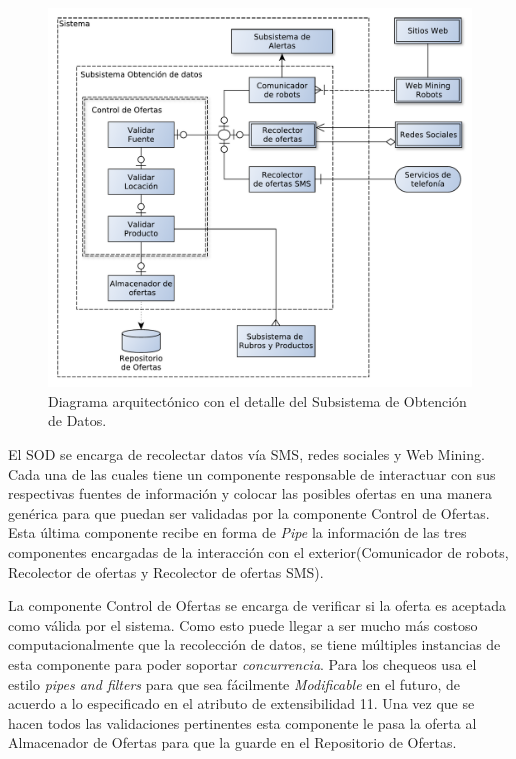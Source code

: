 \begin{figure}[H]
	\centering
	\includegraphics[width=\textwidth]{graficos/arch/Sistema_obtenedor_datos.pdf}
	\caption{Diagrama arquitectónico con el detalle del \textsf{Subsistema de Obtención de Datos}.}
\end{figure}

El SOD se encarga de recolectar datos vía SMS, redes sociales y Web Mining. Cada una de las cuales tiene un componente responsable de interactuar con sus respectivas fuentes de información y colocar las posibles ofertas en una manera genérica para que puedan ser validadas por la componente \textsf{Control de Ofertas}. Esta última componente recibe en forma de \emph{Pipe} la información de las tres componentes encargadas de la interacción con el exterior(\textsf{Comunicador de robots}, \textsf{Recolector de ofertas} y \textsf{Recolector de ofertas SMS}).
 \vspace{9pt} 


La componente \textsf{Control de Ofertas} se encarga de verificar si la oferta es aceptada como válida por el sistema. Como esto puede llegar a ser mucho más costoso computacionalmente que la recolección de datos, se tiene múltiples instancias de esta componente para poder soportar \emph{concurrencia}. Para los chequeos usa el estilo \emph{pipes and filters} para que sea fácilmente \emph{Modificable} en el futuro, de acuerdo a lo especificado en el atributo de extensibilidad 11. Una vez que se hacen todos las validaciones pertinentes esta componente le pasa la oferta al \textsf{Almacenador de Ofertas} para que la guarde en el \textsf{Repositorio de Ofertas}.
 \vspace{9pt} 

